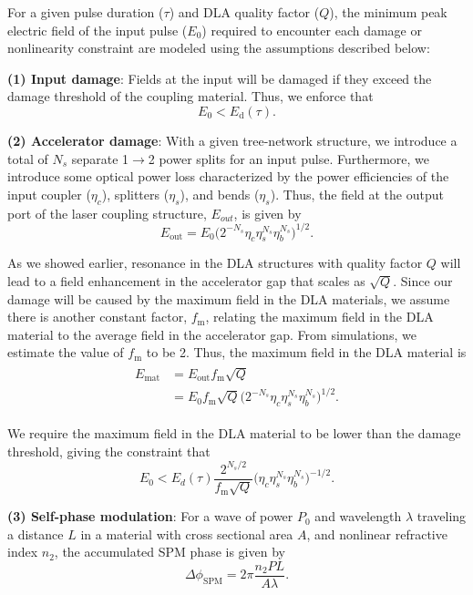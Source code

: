 For a given pulse duration ($\tau$) and DLA quality factor ($Q$), the minimum peak electric field of the input pulse ($E_0$) required to encounter each damage or nonlinearity constraint are modeled using the assumptions described below:

\textbf{(1) Input damage}: Fields at the input will be damaged if they exceed the damage threshold of the coupling material. Thus, we enforce that
\begin{equation}
E_0 < E_\textrm{d}(\tau).
\end{equation}

\textbf{(2) Accelerator damage}: With a given tree-network structure, we introduce a total of $N_s$ separate 1$\to$2 power splits for an input pulse. Furthermore, we introduce some optical power loss characterized by the power efficiencies of the input coupler ($\eta_{c}$), splitters ($\eta_s$), and bends ($\eta_s$). Thus, the field at the output port of the laser coupling structure, $E_{out}$, is given by
\begin{equation}
E_{\textrm{out}} = E_0 \Big( 2^{-N_s} \eta_c \eta_s^{N_s} \eta_b^{N_s} \Big)^{1/2}.
\end{equation}

As we showed earlier, resonance in the DLA structures with quality factor $Q$ will lead to a field enhancement in the accelerator gap that scales as $\sqrt{Q}$. Since our damage will be caused by the maximum field in the DLA materials, we assume there is another constant factor, $f_\textrm{m}$, relating the maximum field in the DLA material to the average field in the accelerator gap. From simulations, we estimate the value of $f_\textrm{m}$ to be 2. Thus, the maximum field in the DLA material is
\begin{align}
\begin{split}
E_{\textrm{mat}} &= E_\textrm{out} f_\textrm{m} \sqrt{Q} \\
 &= E_0 f_\textrm{m} \sqrt{Q} \Big( 2^{-N_s} \eta_c \eta_s^{N_s} \eta_b^{N_s} \Big)^{1/2}.
 \end{split}
\end{align}

We require the maximum field in the DLA material to be lower than the damage threshold, giving the constraint that
\begin{equation}
E_0 < E_d(\tau) \frac{2^{N_s/2}}{f_\textrm{m} \sqrt{Q}} \Big( \eta_c \eta_s^{N_s} \eta_b^{N_s} \Big)^{-1/2}.
\end{equation}

\textbf{(3) Self-phase modulation}: For a wave of power $P_0$ and wavelength $\lambda$ traveling a distance $L$ in a material with cross sectional area $A$, and nonlinear refractive index $n_2$, the accumulated SPM phase is given by \cite{teich1991fundamentals}
\begin{equation}
\Delta\phi_\textrm{SPM} = 2\pi \frac{n_2 PL}{A\lambda}.
\end{equation}

